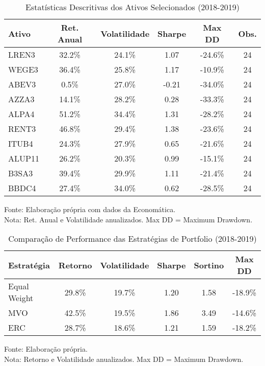 \begin{table}[htbp]
\centering
\caption{Estatísticas Descritivas dos Ativos Selecionados (2018-2019)}
\label{tab:estatisticas_individuais}
\begin{tabular}{|l|c|c|c|c|c|}
\hline
\textbf{Ativo} & \textbf{Ret. Anual} & \textbf{Volatilidade} & \textbf{Sharpe} & \textbf{Max DD} & \textbf{Obs.} \\
\hline
LREN3 & 32.2\% & 24.1\% & 1.07 & -24.6\% & 24 \\
WEGE3 & 36.4\% & 25.8\% & 1.17 & -10.9\% & 24 \\
ABEV3 & 0.5\% & 27.0\% & -0.21 & -34.0\% & 24 \\
AZZA3 & 14.1\% & 28.2\% & 0.28 & -33.3\% & 24 \\
ALPA4 & 51.2\% & 34.4\% & 1.31 & -28.2\% & 24 \\
RENT3 & 46.8\% & 29.4\% & 1.38 & -23.6\% & 24 \\
ITUB4 & 24.3\% & 27.9\% & 0.65 & -21.6\% & 24 \\
ALUP11 & 26.2\% & 20.3\% & 0.99 & -15.1\% & 24 \\
B3SA3 & 39.4\% & 29.9\% & 1.11 & -21.4\% & 24 \\
BBDC4 & 27.4\% & 34.0\% & 0.62 & -28.5\% & 24 \\
\hline
\end{tabular}
\footnotesize
Fonte: Elaboração própria com dados da Economática.\\
Nota: Ret. Anual e Volatilidade anualizados. Max DD = Maximum Drawdown.
\end{table}


\begin{table}[htbp]
\centering
\caption{Comparação de Performance das Estratégias de Portfolio (2018-2019)}
\label{tab:performance_estrategias}
\begin{tabular}{|l|c|c|c|c|c|}
\hline
\textbf{Estratégia} & \textbf{Retorno} & \textbf{Volatilidade} & \textbf{Sharpe} & \textbf{Sortino} & \textbf{Max DD} \\
\hline
Equal Weight & 29.8\% & 19.7\% & 1.20 & 1.58 & -18.9\% \\
MVO & 42.5\% & 19.5\% & 1.86 & 3.49 & -14.6\% \\
ERC & 28.7\% & 18.6\% & 1.21 & 1.59 & -18.2\% \\
\hline
\end{tabular}
\footnotesize
Fonte: Elaboração própria.\\
Nota: Retorno e Volatilidade anualizados. Max DD = Maximum Drawdown.
\end{table}


